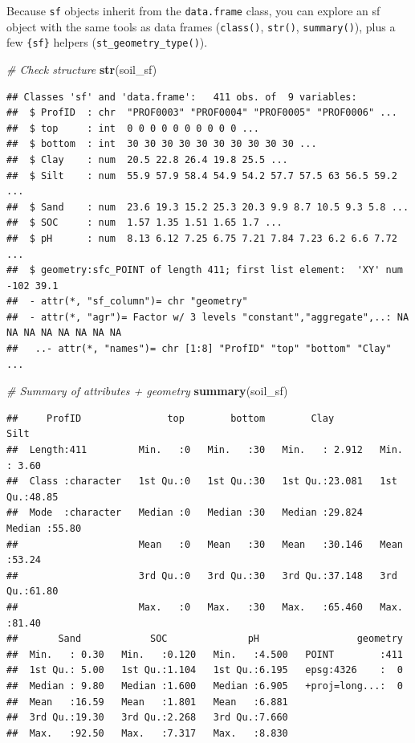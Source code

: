 \documentclass[
  10pt,
  b5paper,
  oneside]{book}
\newenvironment{Shaded}{\begin{snugshade}}{\end{snugshade}}
\newcommand{\CommentTok}[1]{\textcolor[rgb]{0.56,0.35,0.01}{\textit{#1}}}
\newcommand{\FunctionTok}[1]{\textcolor[rgb]{0.13,0.29,0.53}{\textbf{#1}}}
\newcommand{\NormalTok}[1]{#1}
\begin{document}
Because \texttt{sf} objects inherit from the \texttt{data.frame} class, you can explore an sf object with the same tools as data frames (\texttt{class()}, \texttt{str()}, \texttt{summary()}), plus a few \texttt{\{sf\}} helpers (\texttt{st\_geometry\_type()}).

\begin{Shaded}
\begin{Highlighting}[]
\CommentTok{\# Check structure}
\FunctionTok{str}\NormalTok{(soil\_sf)}
\end{Highlighting}
\end{Shaded}

\begin{verbatim}
## Classes 'sf' and 'data.frame':   411 obs. of  9 variables:
##  $ ProfID  : chr  "PROF0003" "PROF0004" "PROF0005" "PROF0006" ...
##  $ top     : int  0 0 0 0 0 0 0 0 0 0 ...
##  $ bottom  : int  30 30 30 30 30 30 30 30 30 30 ...
##  $ Clay    : num  20.5 22.8 26.4 19.8 25.5 ...
##  $ Silt    : num  55.9 57.9 58.4 54.9 54.2 57.7 57.5 63 56.5 59.2 ...
##  $ Sand    : num  23.6 19.3 15.2 25.3 20.3 9.9 8.7 10.5 9.3 5.8 ...
##  $ SOC     : num  1.57 1.35 1.51 1.65 1.7 ...
##  $ pH      : num  8.13 6.12 7.25 6.75 7.21 7.84 7.23 6.2 6.6 7.72 ...
##  $ geometry:sfc_POINT of length 411; first list element:  'XY' num  -102 39.1
##  - attr(*, "sf_column")= chr "geometry"
##  - attr(*, "agr")= Factor w/ 3 levels "constant","aggregate",..: NA NA NA NA NA NA NA NA
##   ..- attr(*, "names")= chr [1:8] "ProfID" "top" "bottom" "Clay" ...
\end{verbatim}

\begin{Shaded}
\begin{Highlighting}[]
\CommentTok{\# Summary of attributes + geometry}
\FunctionTok{summary}\NormalTok{(soil\_sf)}
\end{Highlighting}
\end{Shaded}

\begin{verbatim}
##     ProfID               top        bottom        Clay             Silt      
##  Length:411         Min.   :0   Min.   :30   Min.   : 2.912   Min.   : 3.60  
##  Class :character   1st Qu.:0   1st Qu.:30   1st Qu.:23.081   1st Qu.:48.85  
##  Mode  :character   Median :0   Median :30   Median :29.824   Median :55.80  
##                     Mean   :0   Mean   :30   Mean   :30.146   Mean   :53.24  
##                     3rd Qu.:0   3rd Qu.:30   3rd Qu.:37.148   3rd Qu.:61.80  
##                     Max.   :0   Max.   :30   Max.   :65.460   Max.   :81.40  
##       Sand            SOC              pH                 geometry  
##  Min.   : 0.30   Min.   :0.120   Min.   :4.500   POINT        :411  
##  1st Qu.: 5.00   1st Qu.:1.104   1st Qu.:6.195   epsg:4326    :  0  
##  Median : 9.80   Median :1.600   Median :6.905   +proj=long...:  0  
##  Mean   :16.59   Mean   :1.801   Mean   :6.881                      
##  3rd Qu.:19.30   3rd Qu.:2.268   3rd Qu.:7.660                      
##  Max.   :92.50   Max.   :7.317   Max.   :8.830
\end{verbatim}
\end{document}
